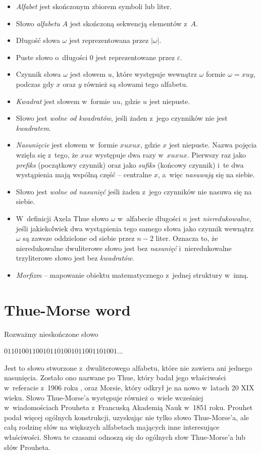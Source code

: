 \documentclass[document]{xmgr}
\begin{document}
\begin{itemize}
\item \emph{Alfabet} jest skończonym zbiorem symboli lub liter.
\item Słowo \emph{alfabetu} $A$ jest skończoną sekwencją elementów z~$A$. 
\item Długość słowa $\omega$ jest reprezentowana przez $|\omega|$.
\item Puste słowo o~długości $0$ jest reprezentowane przez $\varepsilon$.
\item Czynnik słowa $\omega$ jest słowem $u$, które występuje wewnątrz $\omega$ formie $\omega = xuy$, podczas gdy $x$ oraz $y$ również są słowami tego alfabetu.
\item \emph{Kwadrat} jest słowem w~formie $uu$, gdzie $u$ jest niepuste.
\item Słowo jest \emph{wolne od kwadratów}, jeśli żaden z~jego czynników nie jest \emph{kwadratem}.
\item \emph{Nasunięcie} jest słowem w~formie $xuxux$, gdzie $x$ jest niepuste. Nazwa pojęcia wzięła się z~tego, że $xux$ występuje dwa razy w~$xuxux$. Pierwszy raz jako \emph{prefiks} (początkowy czynnik) oraz jako \emph{sufiks} (końcowy czynnik) i~te dwa wystąpienia mają wspólną część -- centralne $x$, a~więc \emph{nasuwają} się na siebie.
\item Słowo jest \emph{wolne od nasunięć} jeśli żaden z~jego czynników nie nasuwa się na siebie.
\item W~definicji Axela Thue słowo $\omega$ w~alfabecie długości $n$ jest \emph{nieredukowalne}, jeśli jakiekolwiek dwa wystąpienia tego samego słowa jako czynnik wewnątrz $\omega$ są zawsze oddzielone od siebie przez $n-2$ liter. Oznacza to, że nieredukowalne dwuliterowe słowo jest bez \emph{nasunięć} i~nieredukowalne trzyliterowe słowo jest bez \emph{kwadratów}.
\item \emph{Morfizm} -- mapowanie obiektu matematycznego z~jednej struktury w~inną.
\end{itemize}



\section{Thue-Morse word}
Rozważmy nieskończone słowo

{\centering $01101001100101101001011001101001 ...$ \par}

Jest to słowo stworzone z~dwuliterowego alfabetu, które nie zawiera ani jednego nasunięcia. Zostało ono nazwane po Thue, który badał jego właściwości w~referacie z~1906 roku \cite{repetition2}, oraz Morsie, który odkrył je na nowo w~latach 20 XIX wieku. Słowo Thue-Morse'a występuje również o~wiele wcześniej w~wiadomościach  Prouheta \cite{prouhet} z~Francuską Akademią Nauk w~1851 roku. Prouhet podał więcej ogólnych konstrukcji, uzyskując nie tylko słowo Thue-Morse'a, ale całą rodzinę słów na większych alfabetach mających inne interesujące właściwości. Słowa te czasami odnoszą się do ogólnych słow Thue-Morse'a lub słów Prouheta.
\end{document}
